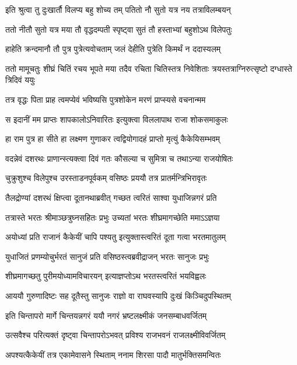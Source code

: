 \twolineshloka
{इति श्रुत्वा तु दुःखार्तौ विलप्य बहु शोच्य तम्}
{पतितो नौ सुतो यत्र नय तत्राविलम्बयन्} %

\twolineshloka
{ततो नीतौ सुतो यत्र मया तौ वृद्धदम्पती}
{स्पृष्ट्वा सुतं तौ हस्ताभ्यां बहुशोऽथ विलेपतुः} %

\twolineshloka
{हाहेति क्रन्दमानौ तौ पुत्र पुत्रेत्यवोचताम्}
{जलं देहीति पुत्रेति किमर्थं न ददास्यलम्} %

\threelineshloka
{ततो मामूचतुः शीघ्रं चितिं रचय भूपते}
{मया तदैव रचिता चितिस्तत्र निवेशिताः}
{त्रयस्तत्राग्निरुत्सृष्टो दग्धास्ते त्रिदिवं ययुः} %

\twolineshloka
{तत्र वृद्धः पिता प्राह त्वमप्येवं भविष्यसि}
{पुत्रशोकेन मरणं प्राप्स्यसे वचनान्मम} %

\twolineshloka
{स इदानीं मम प्राप्तः शापकालोऽनिवारितः}
{इत्युक्त्वा विललापाथ राजा शोकसमाकुलः} %

\twolineshloka
{हा राम पुत्र हा सीते हा लक्ष्मण गुणाकर}
{त्वद्वियोगादहं प्राप्तो मृत्युं कैकेयिसम्भवम्} %

\twolineshloka
{वदन्नेवं दशरथः प्राणान्स्त्यक्त्वा दिवं गतः}
{कौसल्या च सुमित्रा च तथाऽन्या राजयोषितः} %

\twolineshloka
{चुक्रुशुश्च विलेपुश्च उरस्ताडनपूर्वकम्}
{वसिष्ठः प्रययौ तत्र प्रातर्मन्त्रिभिरावृतः} %

\twolineshloka
{तैलद्रोण्यां दशरथं क्षिप्त्वा दूतानथाब्रवीत्}
{गच्छत त्वरितं साश्वा युधाजिन्नगरं प्रति} %

\twolineshloka
{तत्रास्ते भरतः श्रीमाञ्छत्रुघ्नसहितः प्रभुः}
{उच्यतां भरतः शीघ्रमागच्छेति ममाऽऽज्ञया} %

\twolineshloka
{अयोध्यां प्रति राजानं कैकेयीं चापि पश्यतु}
{इत्युक्तास्त्वरितं दूता गत्वा भरतमातुलम्} %

\twolineshloka
{युधाजितं प्रणम्योचुर्भरतं सानुजं प्रति}
{वसिष्ठस्त्वब्रवीद्राजन् भरतः सानुजः प्रभुः} %

\twolineshloka
{शीघ्रमागच्छतु पुरीमयोध्यामविचारयन्}
{इत्याज्ञप्तोऽथ भरतस्त्वरितं भयविह्वलः} %

\twolineshloka
{आययौ गुरुणादिष्टः सह दूतैस्तु सानुजः}
{राज्ञो वा राघवस्यापि दुःखं किञ्चिदुपस्थितम्} %

\twolineshloka
{इति चिन्तापरो मार्गे चिन्तयन्नगरं ययौ}
{नगरं भ्रष्टलक्ष्मीकं जनसम्बाधवर्जितम्} %

\twolineshloka
{उत्सवैश्च परित्यक्तं दृष्ट्वा चिन्तापरोऽभवत्}
{प्रविश्य राजभवनं राजलक्ष्मीविवर्जितम्} %

\twolineshloka
{अपश्यत्कैकेयीं तत्र एकामेवासने स्थिताम्}
{ननाम शिरसा पादौ मातुर्भक्तिसमन्वितः} %

